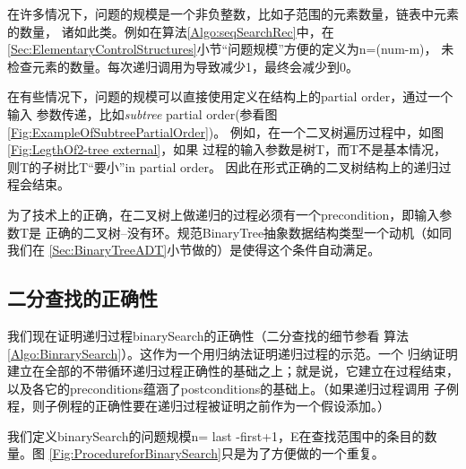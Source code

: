 在许多情况下，问题的规模是一个非负整数，比如子范围的元素数量，链表中元素的数量，
诸如此类。例如在算法\ref{Algo:seqSearchRec}中，在
\ref{Sec:ElementaryControlStructures}小节“问题规模”方便的定义为n=(num-m)，
未检查元素的数量。每次递归调用为导致减少1，最终会减少到0。

在有些情况下，问题的规模可以直接使用定义在结构上的partial order，通过一个输入
参数传递，比如\emph{subtree} partial order(参看图\ref{Fig:ExampleOfSubtreePartialOrder})。
例如，在一个二叉树遍历过程中，如图\ref{Fig:LegthOf2-tree external}，如果
过程的输入参数是树T，而T不是基本情况，则T的子树比T“要小”in partial order。
因此在形式正确的二叉树结构上的递归过程会结束。

为了技术上的正确，在二叉树上做递归的过程必须有一个precondition，即输入参数T是
正确的二叉树--没有环。规范BinaryTree抽象数据结构类型一个动机（如同我们在
\ref{Sec:BinaryTreeADT}小节做的）是使得这个条件自动满足。

\subsection{二分查找的正确性}\label{Sec:CorrectnessofBinarySearch}
我们现在证明递归过程binarySearch的正确性（二分查找的细节参看
算法\ref{Algo:BinrarySearch}）。这作为一个用归纳法证明递归过程的示范。一个
归纳证明建立在全部的不带循环递归过程正确性的基础之上；就是说，它建立在过程结束，
以及各它的preconditions蕴涵了postconditions的基础上。（如果递归过程调用
子例程，则子例程的正确性要在递归过程被证明之前作为一个假设添加。）

我们定义binarySearch的问题规模n= last -first+1，E在查找范围中的条目的数量。图
\ref{Fig:ProcedureforBinarySearch}只是为了方便做的一个重复。

